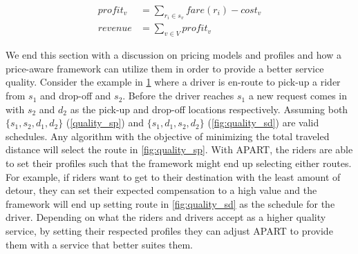 \begin{align}
\label{eq:profit} 
profit_v &= \sum_{r_i \in s_v}fare(r_i) - cost_v\\
revenue &= \sum_{v \in V}profit_v
\end{align}

We end this section with a discussion on pricing models and profiles and how a price-aware framework can utilize them in order to provide a better service quality. Consider the example in \cref{fig:quality_eg} where a driver is en-route to pick-up a rider from $s_1$ and drop-off and $s_2$. Before the driver reaches $s_1$ a new request comes in with $s_2$ and $d_2$ as the pick-up and drop-off locations respectively. Assuming both $\lbrace s_1, s_2, d_1, d_2 \rbrace$ (\cref{quality_sp}) and $\lbrace s_1, d_1, s_2, d_2 \rbrace$ (\cref{fig:quality_sd}) are valid schedules. Any algorithm with the objective of minimizing the total traveled distance will select the route in \cref{fig:quality_sp}. With APART, the riders are able to set their profiles such that the framework might end up selecting either routes. For example, if riders want to get to their destination with the least amount of detour, they can set their expected compensation to a high value and the framework will end up setting route in \cref{fig:quality_sd} as the schedule for the driver. Depending on what the riders and drivers accept as a higher quality service, by setting their respected profiles they can adjust APART to provide them with a service that better suites them.

\begin{figure}[!ht]
	\centering
	\vspace{-0mm}\caption{} \vspace{-2mm} \label{fig:quality_eg}
\end{figure}\vspace{-0mm}

